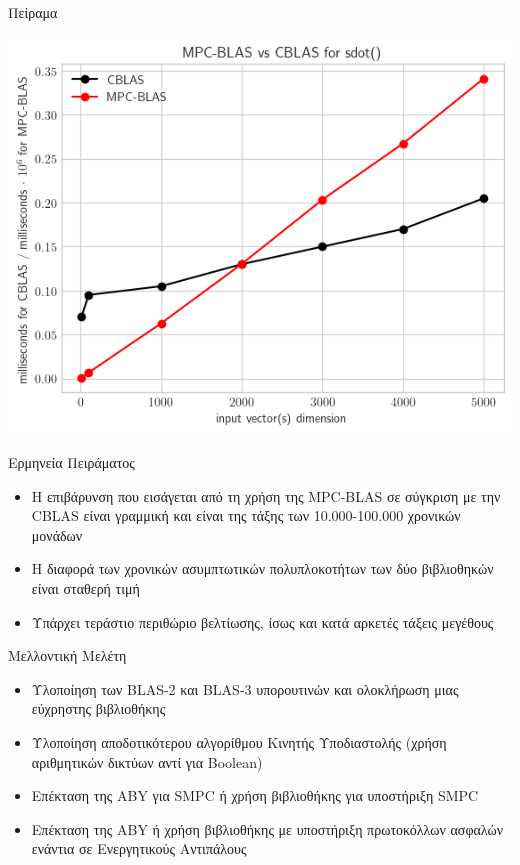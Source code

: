 \documentclass[10pt]{beamer}
\begin{document}
    \begin{frame}[fragile, c]{Πείραμα}
        \begin{center}
            \includegraphics[scale=0.7]{./images/mpc-blas-timings-graph}
        \end{center}
    \end{frame}

    \begin{frame}{Ερμηνεία Πειράματος}
        \begin{block}{}
            \begin{itemize}
                \item Η επιβάρυνση που εισάγεται από τη χρήση της MPC-BLAS σε σύγκριση με την CBLAS είναι γραμμική και είναι της τάξης των 10.000-100.000 χρονικών μονάδων
                \item Η διαφορά των χρονικών ασυμπτωτικών πολυπλοκοτήτων των δύο βιβλιοθηκών είναι σταθερή τιμή
                \item Υπάρχει τεράστιο περιθώριο βελτίωσης, ίσως και κατά αρκετές τάξεις μεγέθους
            \end{itemize}
        \end{block}

    \end{frame}

    \begin{frame}{Μελλοντική Μελέτη}
        \begin{block}{}
        \begin{itemize}
            \item Υλοποίηση των BLAS-2 και BLAS-3 υπορουτινών και ολοκλήρωση μιας εύχρηστης βιβλιοθήκης
            \item Υλοποίηση αποδοτικότερου αλγορίθμου Κινητής Υποδιαστολής (χρήση αριθμητικών δικτύων αντί για Boolean)
            \item Επέκταση της ABY για SMPC ή χρήση βιβλιοθήκης για υποστήριξη SMPC
            \item Επέκταση της ABY ή χρήση βιβλιοθήκης με υποστήριξη πρωτοκόλλων ασφαλών ενάντια σε Ενεργητικούς Αντιπάλους
        \end{itemize}
            \end{block}
    \end{frame}
\end{document}
